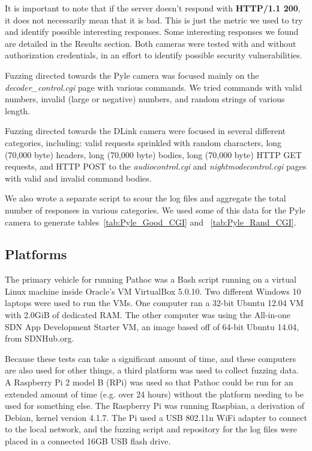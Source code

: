 \documentclass[letterpaper,twocolumn,10pt]{article}
\begin{document}
It is important to note that if the server doesn't respond with \textbf{HTTP/1.1 200}, it does not necessarily mean that it is bad. This is just the metric we used to try and identify possible interesting responses. Some interesting responses we found are detailed in the Results section. Both cameras were tested with and without authorization credentials, in an effort to identify possible security vulnerabilities. 

Fuzzing directed towards the Pyle camera was focused mainly on the \textit{decoder\_control.cgi} page with various commands. We tried commands with valid numbers, invalid (large or negative) numbers, and random strings of various length. 

Fuzzing directed towards the DLink camera were focused in several different categories, including: valid requests sprinkled with random characters, long (70,000 byte) headers, long (70,000 byte) bodies, long (70,000 byte) HTTP GET requests, and HTTP POST to the \textit{audiocontrol.cgi} and \textit{nightmodecontrol.cgi} pages with valid and invalid command bodies. 

We also wrote a separate script to scour the log files and aggregate the total number of responses in various categories. We used some of this data for the Pyle camera to generate tables~\ref{tab:Pyle_Good_CGI} and ~\ref{tab:Pyle_Rand_CGI}. 


\subsection{Platforms}
The primary vehicle for running Pathoc was a Bash script running on a virtual Linux machine inside Oracle's VM VirtualBox 5.0.10. Two different Windows 10 laptops were used to run the VMs. One computer ran a 32-bit Ubuntu 12.04 VM with 2.0GiB of dedicated RAM. The other computer was using the All-in-one SDN App Development Starter VM, an image based off of 64-bit Ubuntu 14.04, from SDNHub.org.

Because these tests can take a significant amount of time, and these computers are also used for other things, a third platform was used to collect fuzzing data. A Raspberry Pi 2 model B (RPi) was used so that Pathoc could be run for an extended amount of time (e.g. over 24 hours) without the platform needing to be used for something else. The Raspberry Pi was running Raspbian, a derivation of Debian, kernel version 4.1.7. The Pi used a USB 802.11n WiFi adapter to connect to the local network, and the fuzzing script and repository for the log files were placed in a connected 16GB USB flash drive.
\end{document}
